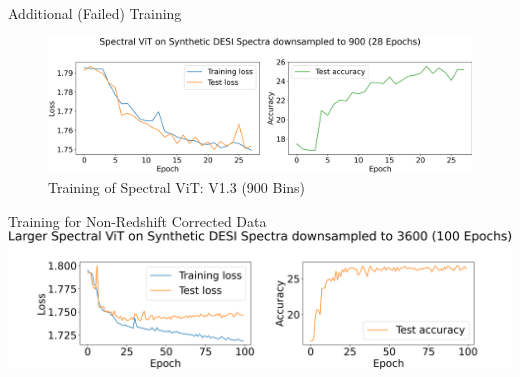 \begin{frame}{Additional (Failed) Training}
    \begin{figure}[t!]
        \centering
        \includegraphics[width=\linewidth]{figures/vit_model_V1.3_muchsmallermodeltraining_new.png}
        \caption{Training of Spectral ViT: V1.3 (900 Bins)}
        \label{fig:vit1.3_training}
    \end{figure}
\end{frame}

\begin{frame}{Training for Non-Redshift Corrected Data}
\centering
\includegraphics[width=\linewidth]{figures/Presentation/v1/vit_model_V1_bigtraining_new.png}
\end{frame}

